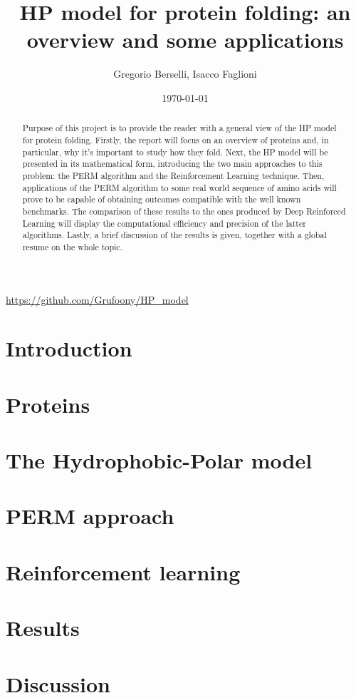 \documentclass[12pt,a4paper]{article}
\title{HP model for protein folding: an overview and some applications}
\author{Gregorio Berselli, Isacco Faglioni}
\date{\today}
\begin{document}
\maketitle
\begin{center}
	\url{https://github.com/Grufoony/HP_model}
\end{center}

\begin{abstract}
Purpose of this project is to provide the reader with a general view of the HP model for protein folding.
Firstly, the report will focus on an overview of proteins and, in particular, why it's important to study how they fold.
Next, the HP model will be presented in its mathematical form, introducing the two main approaches to this problem: the PERM algorithm and the Reinforcement Learning technique.
Then, applications of the PERM algorithm to some real world sequence of amino acids will prove to be capable of obtaining outcomes compatible with the well known benchmarks. The comparison of these results to the ones produced by Deep Reinforced Learning will display the computational efficiency and precision of the latter algorithms.
Lastly, a brief discussion of the results is given, together with a global resume on the whole topic.
\end{abstract}
\thispagestyle{empty}

\newpage
\thispagestyle{empty}
\addtocounter{page}{-2}
\mbox{}

\tableofcontents
\pagebreak

\section*{Introduction}

\pagebreak

\section{Proteins}

\pagebreak

\section{The Hydrophobic-Polar model} \label{sec:model}

\pagebreak

\section{PERM approach}

\pagebreak

\section{Reinforcement learning}

\pagebreak

\section{Results}

\pagebreak

\section{Discussion}

\pagebreak

\newpage
\thispagestyle{empty}
\mbox{}

\printbibliography
\end{document}
